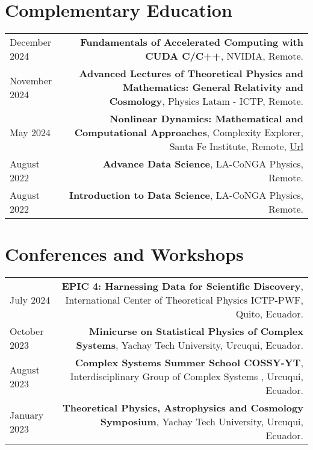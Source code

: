 \documentclass{article}
\begin{document}
\section*{Complementary Education}
\begin{tabular}{L!{\vrule}R}
	
	  December 2024 & \textbf{Fundamentals of Accelerated Computing with CUDA C/C++}, NVIDIA, Remote.\\
    November 2024 & \textbf{Advanced Lectures of Theoretical Physics and Mathematics: General Relativity and Cosmology}, Physics Latam - ICTP, Remote. \\ 

    May 2024 & \textbf{Nonlinear Dynamics: Mathematical and Computational Approaches}, Complexity Explorer, Santa Fe Institute, Remote, \href{https://www.complexityexplorer.org/courses/184-nonlinear-dynamics-mathematical-and-computational-approaches/certificates/3966304258}{Url}\\

    August 2022 & \textbf{Advance Data Science}, LA-CoNGA Physics, Remote. \\

    August 2022 & \textbf{Introduction to Data Science}, LA-CoNGA Physics, Remote. \\


\end{tabular}

\section*{Conferences and Workshops}
\begin{tabular}{L!{\vrule}R}

    July 2024 & \textbf{EPIC 4: Harnessing Data for Scientific Discovery}, International Center of Theoretical Physics ICTP-PWF, Quito, Ecuador.\\
    
    October 2023 & \textbf{Minicurse on Statistical Physics of Complex Systems}, Yachay Tech University, Urcuqui, Ecuador. \\

    August 2023 & \textbf{Complex Systems Summer School COSSY-YT}, Interdisciplinary Group of Complex Systems , Urcuqui, Ecuador. \\

    January 2023 & \textbf{Theoretical Physics, Astrophysics and Cosmology Symposium}, Yachay Tech University, Urcuqui, Ecuador. \\



\end{tabular}
\end{document}
